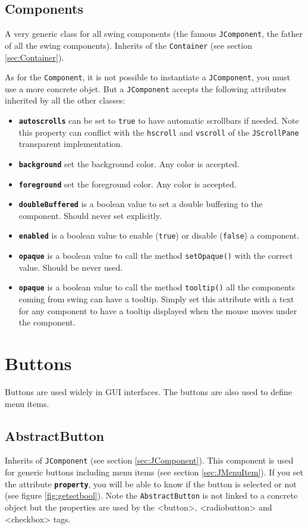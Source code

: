 \documentclass[a4paper,onecolumn,10pt]{book}
\newcommand{\jmethod}[1]{\texttt{\small #1()}}
\newcommand{\jclass}[1]{\texttt{\small #1}}
\newcommand{\tag}[1]{\textsf{<#1>}}
\newcommand{\attr}[1]{\texttt{\small \textbf{#1}}}
\begin{document}
\subsection{\label{sec:JComponent}Components}
A very generic class for all swing components (the famous
\jclass{JComponent}, the father of all the swing components). Inherits of the
\jclass{Container} (see section \ref{sec:Container}).

As for the \jclass{Component}, it is not possible to instantiate a
\jclass{JComponent}, you must use a more concrete objet. But a 
\jclass{JComponent} accepts the following attributes inherited by
all the other classes:
\begin{itemize}
	\item \attr{autoscrolls} can be set to \verb|true| to have automatic
		scrollbars if needed. Note this property can conflict
		with the \verb|hscroll| and \verb|vscroll| of the
		\jclass{JScrollPane} transparent implementation.
	\item \attr{background} set the background color. Any color is accepted.
	\item \attr{foreground} set the foreground color. Any color is accepted.
	\item \attr{doubleBuffered} is a boolean value to set a double buffering
		to the component. Should never set explicitly.
	\item \attr{enabled} is a boolean value to enable (\verb|true|) or
		disable (\verb|false|) a component.
	\item \attr{opaque} is a boolean value to call the method 
	  \jmethod{setOpaque} with the correct value. Should be never used.
	\item \attr{opaque} is a boolean value to call the method 
	  \jmethod{tooltip} all the components coming from swing can have
	  a tooltip. Simply set this attribute with a text for any component
	  to have a tooltip displayed when the mouse moves under the component.
\end{itemize}



 
\section{Buttons}
Buttons are used widely in GUI interfaces. The buttons are also
used to define menu items.

\subsection{\label{sec:AbstractButton}AbstractButton}
Inherits of \jclass{JComponent} (see section \ref{sec:JComponent}).
This component is used for generic buttons including
menu items (see section \ref{sec:JMenuItem}). If you set the
attribute \attr{property}, you will be able to know if the button
is selected or not (see figure \ref{fig:getsetbool}).
Note the \jclass{AbstractButton} is not linked to a concrete object
but the properties are used by the \tag{button}, \tag{radiobutton}
and \tag{checkbox} tags.
\end{document}

